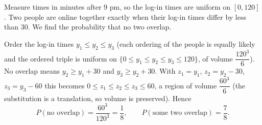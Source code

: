 Measure times in minutes after 9 pm, so the log-in times are uniform on $[0,120]$. Two people are online together exactly when their log-in times differ by less than $30$. We find the probability that no two overlap.

Order the log-in times $y_1\le y_2\le y_3$ (each ordering of the people is equally likely and the ordered triple is uniform on $\{0\le y_1\le y_2\le y_3\le120\}$, of volume $\dfrac{120^3}{6}$). No overlap means $y_2\ge y_1+30$ and $y_3\ge y_2+30$. With $z_1=y_1$, $z_2=y_2-30$, $z_3=y_3-60$ this becomes $0\le z_1\le z_2\le z_3\le60$, a region of volume $\dfrac{60^3}{6}$ (the substitution is a translation, so volume is preserved). Hence
\[
P(\text{no overlap})=\dfrac{60^3}{120^3}=\dfrac{1}{8},\qquad P(\text{some two overlap})=\boxed{\dfrac{7}{8}}.
\]
